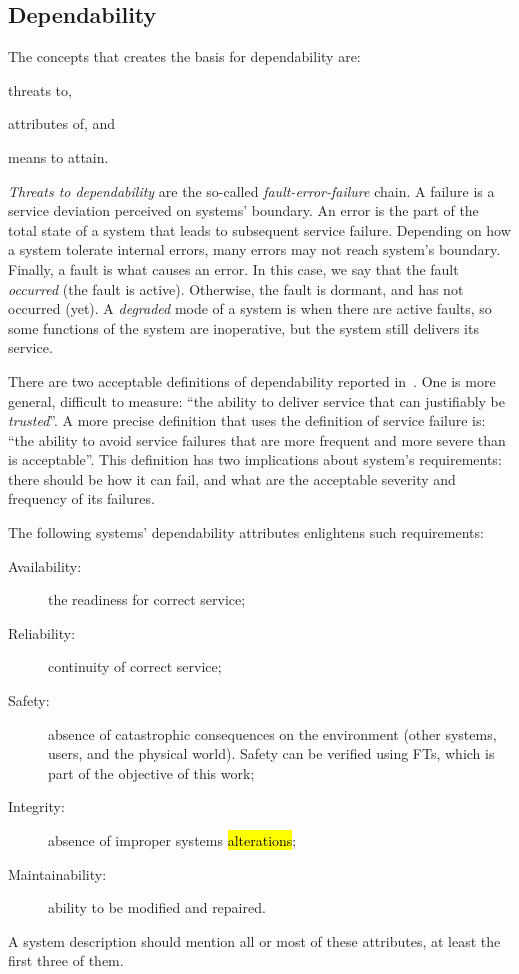 \documentclass[12pt,openright,twoside,a4paper,oldfontcommands,english,brazil,draft]{abntex2}
\theoremstyle{theo}
\begin{document}
\subsection{Dependability}

The concepts that creates the basis for dependability are:
\begin{alineasinline}
  \item threats to,
  \item attributes of, and
  \item means to attain.
\end{alineasinline}

\emph{Threats to dependability} are the so-called \emph{fault-error-failure} chain.
A failure is a service deviation perceived on systems' boundary.
An error is the part of the total state of a system that leads to subsequent service failure.
Depending on how a system tolerate internal errors, many errors may not reach system's boundary.
Finally, a fault is what causes an error.
In this case, we say that the fault \emph{occurred} (the fault is active).
Otherwise, the fault is dormant, and has not occurred (yet).
A \emph{degraded} mode of a system is when there are active faults, so some functions of the system are inoperative, but the system still delivers its service.

There are two acceptable definitions of dependability reported in~\cite{ALR+2004}.
One is more general, difficult to measure: ``the ability to deliver service that can justifiably be \emph{trusted}''.
A more precise definition that uses the definition of service failure is: ``the ability to avoid service failures that are more frequent and more severe than is acceptable''.
This definition has two implications about system's requirements: there should be how it can fail, and what are the acceptable severity and frequency of its failures.

The following systems' dependability attributes enlightens such requirements:
\begin{description}
  \item[Availability:] the readiness for correct service;
  \item[Reliability:] continuity of correct service;
  \item[Safety:] absence of catastrophic consequences on the environment (other systems, users, and the physical world).
  Safety can be verified using \acp{FT}, which is part of the objective of this work;
  \item[Integrity:] absence of improper systems \hl{alterations};
  \item[Maintainability:] ability to be modified and repaired.
\end{description}
%
A system description should mention all or most of these attributes, at least the first three of them.
\end{document}
